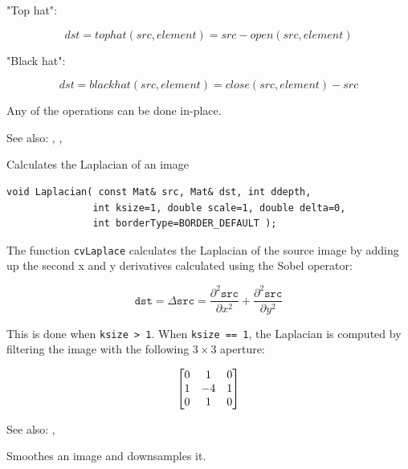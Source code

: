 "Top hat":

\[
dst=tophat(src,element)=src-open(src,element)
\]

"Black hat":

\[
dst=blackhat(src,element)=close(src,element)-src
\]

Any of the operations can be done in-place.

See also: , , 

\label{Laplacian}
Calculates the Laplacian of an image

\begin{lstlisting}
void Laplacian( const Mat& src, Mat& dst, int ddepth,
               int ksize=1, double scale=1, double delta=0,
               int borderType=BORDER_DEFAULT );
\end{lstlisting}
\begin{description}
\end{description}

The function \texttt{cvLaplace} calculates the Laplacian of the source image by adding up the second x and y derivatives calculated using the Sobel operator:

\[
\texttt{dst} = \Delta \texttt{src} = \frac{\partial^2 \texttt{src}}{\partial x^2} + \frac{\partial^2 \texttt{src}}{\partial y^2}
\]


This is done when \texttt{ksize > 1}. When \texttt{ksize == 1}, the Laplacian is computed by filtering the image with the following $3 \times 3$ aperture:

\[ \begin{bmatrix} 0 & 1 & 0\\ 1 & -4 & 1\\ 0 & 1 & 0 \end{bmatrix} \]

See also: ,  

\label{pyrDown}
Smoothes an image and downsamples it.

